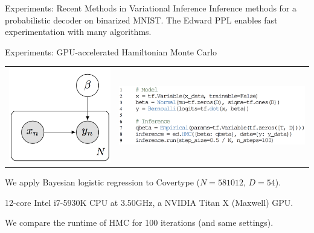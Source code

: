 \documentclass[final]{beamer}
\begin{document}
\begin{frame}[t]
\begin{columns}[t]
\begin{column}{\onecolwid}
\begin{block}{Experiments: Recent Methods in Variational Inference}
\vspace{1ex}
Inference methods for a probabilistic decoder on binarized
MNIST. The Edward \acrshort{PPL} enables fast experimentation with
many algorithms.
\end{block}

\begin{block}{Experiments: GPU-accelerated Hamiltonian Monte Carlo}
\begin{tabular}{cc}
\hspace{-1em}
\includegraphics{img/logistic_graph.png}
&
\includegraphics{img/logistic_code.png}
\end{tabular}
\vspace{1ex}

We apply Bayesian logistic regression to
Covertype ($N=581012$, $D=54$).

12-core Intel i7-5930K CPU at 3.50GHz, a NVIDIA Titan X (Maxwell) GPU.

We compare the runtime of HMC for 100 iterations (and same settings).
\vspace{1ex}


\end{block}
\end{column}
\end{columns}
\end{frame}
\end{document}
